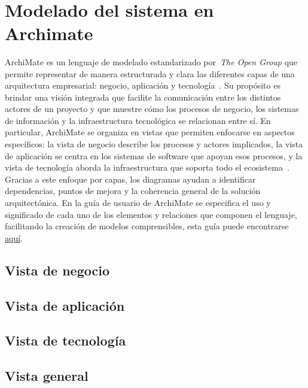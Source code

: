 \label{cap:disenio}
\mbox{}\\
\section{Modelado del sistema en Archimate}
\noindent
ArchiMate es un lenguaje de modelado estandarizado por~\textit{The Open Group} que permite representar de manera estructurada y clara las diferentes capas de una arquitectura empresarial: negocio, aplicación y tecnología~\citep{opengroup_archimate_overview}. Su propósito es brindar una visión integrada que facilite la comunicación entre los distintos actores de un proyecto y que muestre cómo los procesos de negocio, los sistemas de información y la infraestructura tecnológica se relacionan entre sí.
En particular, ArchiMate se organiza en vistas que permiten enfocarse en aspectos específicos: la vista de negocio describe los procesos y actores implicados, la vista de aplicación se centra en los sistemas de software que apoyan esos procesos, y la vista de tecnología aborda la infraestructura que soporta todo el ecosistema~\citep{archi_user_guide}. Gracias a este enfoque por capas, los diagramas ayudan a identificar dependencias, puntos de mejora y la coherencia general de la solución arquitectónica.
En la guía de usuario de ArchiMate se especifica el uso y significado de cada uno de los elementos y relaciones que componen el lenguaje, facilitando la creación de modelos comprensibles, esta guía puede encontrarse \href{https://www.archimatetool.com/downloads/archi/Archi%20User%20Guide.pdf}{aquí}.

\subsection{Vista de negocio}
\noindent


\subsection{Vista de aplicación}
\noindent


\subsection{Vista de tecnología}
\noindent


\subsection{Vista general}
\noindent


